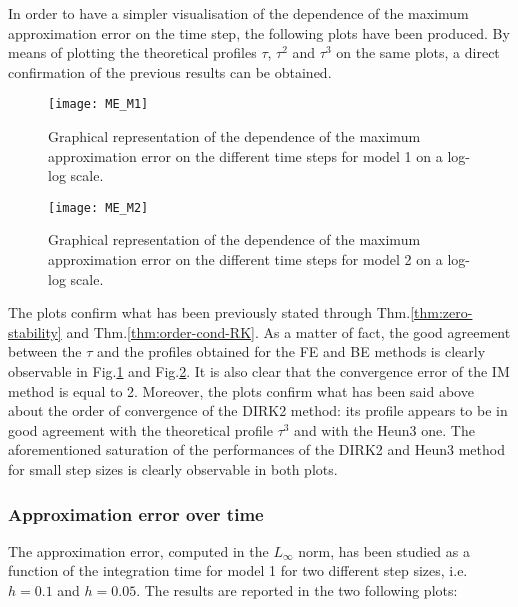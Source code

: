 \documentclass[11pt]{article}
\theoremstyle{theorem}
\theoremstyle{definition}
\begin{document}
In order to have a simpler visualisation of the dependence of the maximum approximation error on the time step, the following plots have been produced. By means of plotting the theoretical profiles $\tau$, $\tau^2$ and $\tau^3$ on the same plots, a direct confirmation of the previous results can be obtained.\\

\begin{figure}[H]
	\begin{center}
		\texttt{[image: ME\_M1]}
	\end{center}
	\caption{Graphical representation of the dependence of the maximum approximation error on the different time steps for model 1 on a log-log scale.
		\label{fig:Err_M1}}
\end{figure}

\begin{figure}[H]
	\begin{center}
		\texttt{[image: ME\_M2]}
	\end{center}
	\caption{Graphical representation of the dependence of the maximum approximation error on the different time steps for model 2 on a log-log scale.
		\label{fig:Err_M2}}
\end{figure}

The plots confirm what has been previously stated through Thm.\ref{thm:zero-stability} and Thm.\ref{thm:order-cond-RK}. As a matter of fact, the good agreement between the $\tau$ and the profiles obtained for the FE and BE methods is clearly observable in Fig.\ref{fig:Err_M1} and Fig.\ref{fig:Err_M2}. It is also clear that the convergence error of the IM method is equal to 2. Moreover, the plots confirm what has been said above about the order of convergence of the DIRK2 method: its profile appears to be in good agreement with the theoretical profile $\tau^3$ and with the Heun3 one. The aforementioned saturation of the performances of the DIRK2 and Heun3 method for small step sizes is clearly observable in both plots.\\

\subsubsection{Approximation error over time}
The approximation error, computed in the $L_\infty$ norm, has been studied as a function of the integration time for model 1 for two different step sizes, i.e. $h=0.1$ and $h=0.05$. The results are reported in the two following plots:
\end{document}
